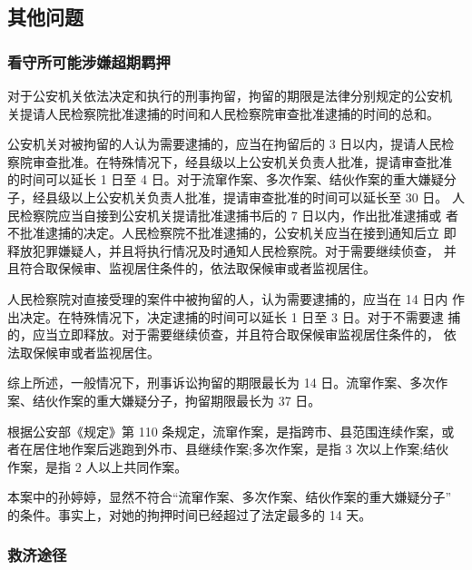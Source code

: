 \documentclass{ctexart}
\begin{document}
\subsection{其他问题}
\subsubsection{看守所可能涉嫌超期羁押}
对于公安机关依法决定和执行的刑事拘留，拘留的期限是法律分别规定的公安机 关提请人民检察院批准逮捕的时间和人民检察院审查批准逮捕的时间的总和。\par
公安机关对被拘留的人认为需要逮捕的，应当在拘留后的 3 日以内，提请人民检 察院审查批准。在特殊情况下，经县级以上公安机关负责人批准，提请审查批准 的时间可以延长 1 日至 4 日。对于流窜作案、多次作案、结伙作案的重大嫌疑分 子，经县级以上公安机关负责人批准，提请审查批准的时间可以延长至 30 日。 人民检察院应当自接到公安机关提请批准逮捕书后的 7 日以内，作出批准逮捕或 者不批准逮捕的决定。人民检察院不批准逮捕的，公安机关应当在接到通知后立 即释放犯罪嫌疑人，并且将执行情况及时通知人民检察院。对于需要继续侦查， 并且符合取保候审、监视居住条件的，依法取保候审或者监视居住。 \par 人民检察院对直接受理的案件中被拘留的人，认为需要逮捕的，应当在 14 日内 作出决定。在特殊情况下，决定逮捕的时间可以延长 1 日至 3 日。对于不需要逮 捕的，应当立即释放。对于需要继续侦查，并且符合取保候审监视居住条件的， 依法取保候审或者监视居住。 \par 综上所述，一般情况下，刑事诉讼拘留的期限最长为 14 日。流窜作案、多次作 案、结伙作案的重大嫌疑分子，拘留期限最长为 37 日。\par
根据公安部《规定》第 110 条规定，流窜作案，是指跨市、县范围连续作案，或 者在居住地作案后逃跑到外市、县继续作案;多次作案，是指 3 次以上作案;结伙 作案，是指 2 人以上共同作案。\par
本案中的孙婷婷，显然不符合“流窜作案、多次作案、结伙作案的重大嫌疑分子”
的条件。事实上，对她的拘押时间已经超过了法定最多的 14 天。
\subsubsection{救济途径}
\end{document}
